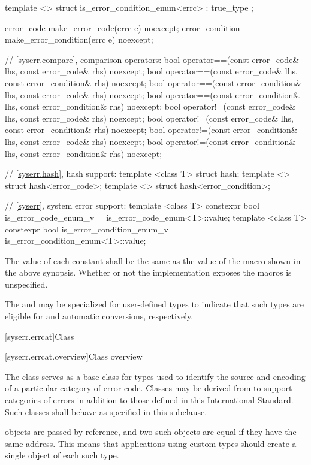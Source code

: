 \begin{codeblock}
{  template <> struct is_error_condition_enum<errc> : true_type {};

  error_code make_error_code(errc e) noexcept;
  error_condition make_error_condition(errc e) noexcept;

  // \ref{syserr.compare}, comparison operators:
  bool operator==(const error_code& lhs, const error_code& rhs) noexcept;
  bool operator==(const error_code& lhs, const error_condition& rhs) noexcept;
  bool operator==(const error_condition& lhs, const error_code& rhs) noexcept;
  bool operator==(const error_condition& lhs, const error_condition& rhs) noexcept;
  bool operator!=(const error_code& lhs, const error_code& rhs) noexcept;
  bool operator!=(const error_code& lhs, const error_condition& rhs) noexcept;
  bool operator!=(const error_condition& lhs, const error_code& rhs) noexcept;
  bool operator!=(const error_condition& lhs, const error_condition& rhs) noexcept;

  // \ref{syserr.hash}, hash support:
  template <class T> struct hash;
  template <> struct hash<error_code>;
  template <> struct hash<error_condition>;

  // \ref{syserr}, system error support:
  template <class T> constexpr bool is_error_code_enum_v
    = is_error_code_enum<T>::value;
  template <class T> constexpr bool is_error_condition_enum_v
    = is_error_condition_enum<T>::value;
}
\end{codeblock}

\pnum The value of each  constant shall be the same as
the value of the  macro shown in the above synopsis. Whether
or not the  implementation exposes the 
macros is unspecified.

\pnum
The  and  may be
specialized for user-defined types to indicate that such types are eligible
for  and  automatic
conversions, respectively.

[syserr.errcat]{Class }

[syserr.errcat.overview]{Class  overview}

\pnum
The class  serves as a base class for types used
to identify the source and encoding of a particular category of error code.
Classes may be derived from  to support
categories of errors in addition to those defined in this International
Standard.
Such classes shall behave as specified in this
subclause. \begin{note}  objects are
passed by reference, and two such objects
are equal if they have the same address. This means that applications using
custom  types should create a single object of each
such type. \end{note}

